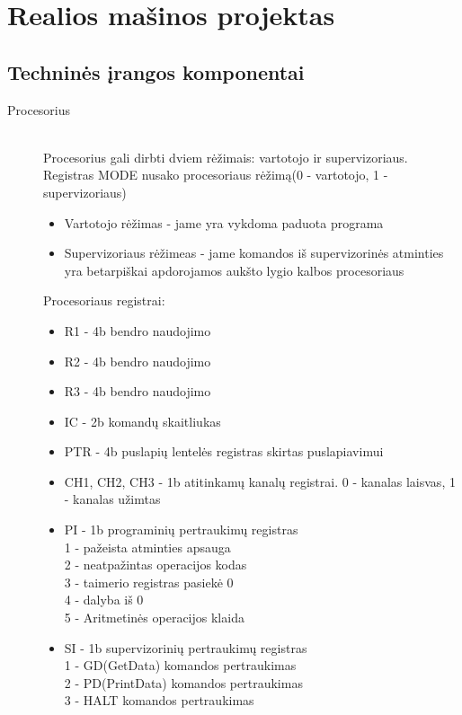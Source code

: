 \section{Realios mašinos projektas}

\subsection{Techninės įrangos komponentai}

\begin{description}
  \item[Procesorius]\leavevmode \\
Procesorius gali dirbti dviem rėžimais: vartotojo ir supervizoriaus. Registras MODE nusako procesoriaus rėžimą(0 - vartotojo, 1 - supervizoriaus)
\begin{itemize}
  \item Vartotojo rėžimas - jame yra vykdoma paduota programa
  \item Supervizoriaus rėžimeas - jame komandos iš supervizorinės atminties yra betarpiškai apdorojamos aukšto lygio kalbos procesoriaus
\end{itemize}
Procesoriaus registrai:
\begin{itemize}
  \item R1 - 4b bendro naudojimo
  \item R2 - 4b bendro naudojimo
  \item R3 - 4b bendro naudojimo
  \item IC - 2b komandų skaitliukas
  \item PTR - 4b puslapių lentelės registras skirtas puslapiavimui
  \item CH1, CH2, CH3 - 1b atitinkamų kanalų registrai. 0 - kanalas laisvas, 1 - kanalas užimtas
  \item PI - 1b programinių pertraukimų registras\leavevmode
		\\1 - pažeista atminties apsauga
		\\2 - neatpažintas operacijos kodas
           	\\3 - taimerio registras pasiekė 0
		\\4 - dalyba iš 0
		\\5 - Aritmetinės operacijos klaida
  \item SI - 1b supervizorinių pertraukimų registras\leavevmode
		\\1 - GD(GetData) komandos pertraukimas
		\\2 - PD(PrintData) komandos pertraukimas
		\\3 - HALT komandos pertraukimas

\end{itemize}
\end{description}
